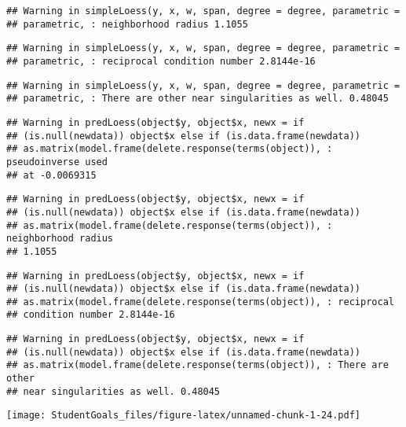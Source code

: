 \documentclass[]{article}
\begin{document}
\begin{verbatim}
## Warning in simpleLoess(y, x, w, span, degree = degree, parametric =
## parametric, : neighborhood radius 1.1055
\end{verbatim}

\begin{verbatim}
## Warning in simpleLoess(y, x, w, span, degree = degree, parametric =
## parametric, : reciprocal condition number 2.8144e-16
\end{verbatim}

\begin{verbatim}
## Warning in simpleLoess(y, x, w, span, degree = degree, parametric =
## parametric, : There are other near singularities as well. 0.48045
\end{verbatim}

\begin{verbatim}
## Warning in predLoess(object$y, object$x, newx = if
## (is.null(newdata)) object$x else if (is.data.frame(newdata))
## as.matrix(model.frame(delete.response(terms(object)), : pseudoinverse used
## at -0.0069315
\end{verbatim}

\begin{verbatim}
## Warning in predLoess(object$y, object$x, newx = if
## (is.null(newdata)) object$x else if (is.data.frame(newdata))
## as.matrix(model.frame(delete.response(terms(object)), : neighborhood radius
## 1.1055
\end{verbatim}

\begin{verbatim}
## Warning in predLoess(object$y, object$x, newx = if
## (is.null(newdata)) object$x else if (is.data.frame(newdata))
## as.matrix(model.frame(delete.response(terms(object)), : reciprocal
## condition number 2.8144e-16
\end{verbatim}

\begin{verbatim}
## Warning in predLoess(object$y, object$x, newx = if
## (is.null(newdata)) object$x else if (is.data.frame(newdata))
## as.matrix(model.frame(delete.response(terms(object)), : There are other
## near singularities as well. 0.48045
\end{verbatim}

\texttt{[image: StudentGoals\_files/figure-latex/unnamed-chunk-1-24.pdf]}
\end{document}
